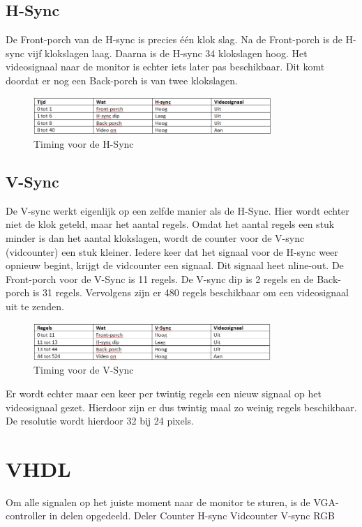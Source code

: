\documentclass[oneside,dutch]{tudelft-report}
\begin{document}
\subsection{H-Sync}
De Front-porch van de H-sync is precies één klok slag. Na de Front-porch is de H-sync vijf klokslagen laag. Daarna is de H-sync 34 klokslagen hoog. Het videosignaal naar de monitor is echter iets later pas beschikbaar. Dit komt doordat er nog een Back-porch is van twee klokslagen. 

\begin{figure}[H]
\center
\includegraphics[width=9cm]{tabel-VGA-1}
\caption{Timing voor de H-Sync}
\label{VGA}
\end{figure}

\subsection{V-Sync}
De V-sync werkt eigenlijk op een zelfde manier als de H-Sync. Hier wordt echter niet de klok geteld, maar het aantal regels. Omdat het aantal regels een stuk minder is dan het aantal klokslagen, wordt de counter voor de V-sync (vidcounter) een stuk kleiner. Iedere keer dat het signaal voor de H-sync weer opnieuw begint, krijgt de vidcounter een signaal. Dit signaal heet nline-out. De Front-porch voor de V-Sync is 11 regels. De V-sync dip is 2 regels en de Back-porch is 31 regels. Vervolgens zijn er 480 regels beschikbaar om een videosignaal uit te zenden.

\begin{figure}[H]
\center
\includegraphics[width=9cm]{tabel-VGA-2}
\caption{Timing voor de V-Sync}
\label{VGA}
\end{figure}

Er wordt echter maar een keer per twintig regels een nieuw signaal op het videosignaal gezet. Hierdoor zijn er dus twintig maal zo weinig regels beschikbaar. De resolutie wordt hierdoor 32 bij 24 pixels.

\section{VHDL}
Om alle signalen op het juiste moment naar de monitor te sturen, is de VGA-controller in delen opgedeeld. 
Deler
Counter
H-sync
Vidcounter
V-sync
RGB
\end{document}
